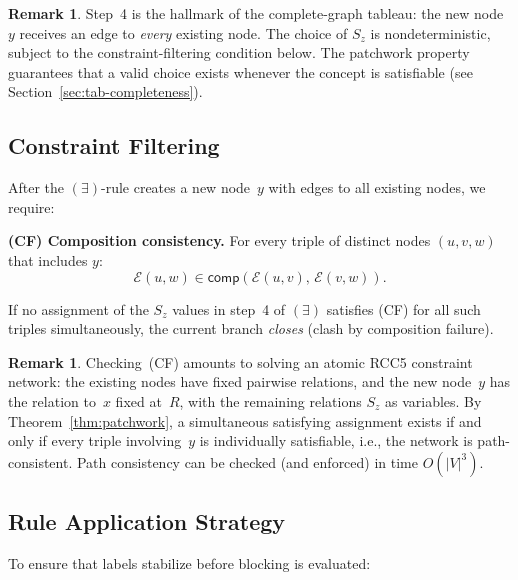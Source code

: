 \documentclass[a4paper,11pt]{article}
\theoremstyle{definition}
\newtheorem{remark}[theorem]{Remark}
\newcommand{\comp}{\ensuremath{\mathsf{comp}}}
\begin{document}
\begin{remark}
Step~4 is the hallmark of the complete-graph tableau: the new node
$y$ receives an edge to \emph{every} existing node.  The choice of
$S_z$ is nondeterministic, subject to the constraint-filtering
condition below.  The patchwork property guarantees that a valid
choice exists whenever the concept is satisfiable (see
Section~\ref{sec:tab-completeness}).
\end{remark}

\subsection{Constraint Filtering}
\label{sec:constraint-filtering}

After the $(\exists)$-rule creates a new node~$y$ with edges to all
existing nodes, we require:

\medskip\noindent\textbf{(CF) Composition consistency.}\; For every
triple of distinct nodes $(u, v, w)$ that includes $y$:
\[
  \mathcal{E}(u,w) \in \comp(\mathcal{E}(u,v),\, \mathcal{E}(v,w)).
\]

If no assignment of the $S_z$ values in step~4 of $(\exists)$
satisfies (CF) for all such triples simultaneously, the current branch
\emph{closes} (clash by composition failure).

\begin{remark}
Checking~(CF) amounts to solving an atomic RCC5 constraint network:
the existing nodes have fixed pairwise relations, and the new node~$y$
has the relation to~$x$ fixed at~$R$, with the remaining relations
$S_z$ as variables.  By Theorem~\ref{thm:patchwork}, a simultaneous
satisfying assignment exists if and only if every triple involving~$y$
is individually satisfiable, i.e., the network is path-consistent.
Path consistency can be checked (and enforced) in time $O(|V|^3)$.
\end{remark}

\subsection{Rule Application Strategy}
\label{sec:strategy}

To ensure that labels stabilize before blocking is evaluated:
\end{document}

